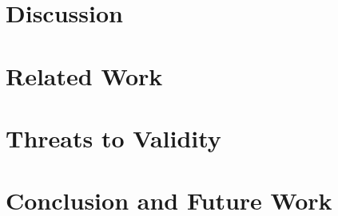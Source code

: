 
\section{Discussion}
\label{chap4:sec:discussion}

\section{Related Work}
\label{chap4:sec:related_work}

\section{Threats to Validity}
\label{chap4:sec:threats_to_validity}

\section{Conclusion and Future Work}
\label{chap4:sec:conclusion}
